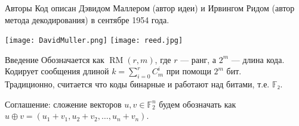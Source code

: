 \documentclass[beameroptions={aspectratio=169}]{beamerswitch}
\DeclareMathOperator{\RM}{RM}
\newcommand{\n}{\\}
\newcommand{\n}{ }
\begin{document}

\begin{nonspeaker}
\begin{frame}{Авторы}
    Код описан Дэвидом Маллером (автор идеи) и Ирвингом Ридом (автор метода декодирования) в сентябре 1954 года.

    \hfil%
    \texttt{[image: DavidMuller.png]}%
    \hfil%
    \texttt{[image: reed.jpg]}%
    \hfil

\end{frame}
\end{nonspeaker}

\begin{frame}{Введение}
    Обозначается как $\RM(r, m)$, где $r$ — ранг, а $2^m$ — длина кода. Кодирует сообщения длиной $k = \sum_{i=0}^{r} C_m^i$ при помощи $2^m$ бит. \n
    Традиционно, считается что коды бинарные и работают над битами, т.е. $𝔽₂$.
    
    Соглашение: сложение векторов $u, v ∈ 𝔽_2^n$ будем обозначать как $u ⊕ v = (u_1 + v_1, u_2 + v_2, …, u_n + v_n)$.
\end{frame}
\end{document}
